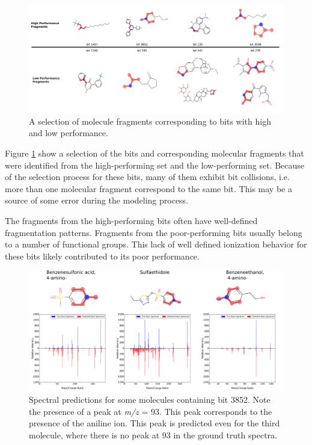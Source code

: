 \documentclass{article}
\begin{document}
\begin{figure}[h]
    \centering
    \includegraphics[width=0.9\linewidth]{./figures/good_bad_molecules_horiz.png}
        \caption[Sample Selection of Fingerprint Bits with High and Low Predictive Accuracy]{A selection of molecule fragments corresponding to bits with high and low performance.}
    \label{fig:good_bad_bit_figures}
\end{figure}

Figure \ref{fig:good_bad_bit_figures} show a selection of the bits and corresponding molecular fragments that were identified from the high-performing set and the low-performing set. Because of the selection process for these bits, many of them exhibit bit collisions, i.e. more than one molecular fragment correspond to the same bit. This may be a source of some error during the modeling process.

The fragments from the high-performing bits often have well-defined fragmentation patterns. Fragments from the poor-performing bits usually belong to a number of functional groups. This lack of well defined ionization behavior for these bits likely contributed to its poor performance.

\begin{figure}[h]
    \centering
    \includegraphics[width=0.95\linewidth]{./figures/bit_3852_highlight_spectra_2.png}
        \caption[Spectral Prediction Examples for bit 3852]{Spectral predictions for some molecules containing bit 3852. Note the presence of a peak at \textit{m/z} = 93. This peak corresponds to the presence of the aniline ion. This peak is predicted even for the third molecule, where there is no peak at 93 in the ground truth spectra.}
    \label{fig:bit_example_spectra}
\end{figure}
\end{document}
